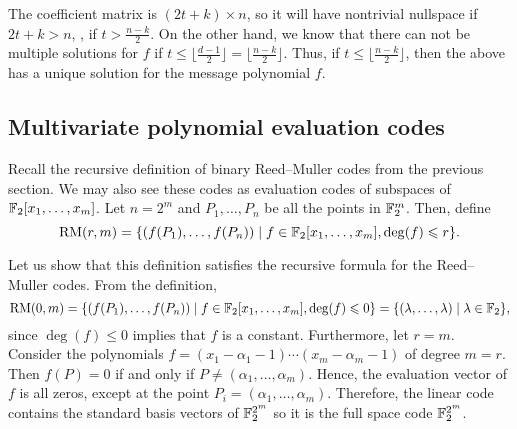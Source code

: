 \documentclass[../main.tex]{subfiles}
\begin{document}
The coefficient matrix is $(2t + k) \times n$, so it will have nontrivial nullspace if $2t + k > n$, \ie, if $t > \frac{n - k}{2}$. On the other hand, we know that there can not be multiple solutions for $f$ if $t \leq \lfloor \frac{d - 1}{2} \rfloor = \lfloor \frac{n - k}{2} \rfloor$. Thus, if $t \leq \lfloor \frac{n - k}{2} \rfloor$, then the above has a unique solution for the message polynomial $f$.

\subsection{Multivariate polynomial evaluation codes}

Recall the recursive definition of binary Reed--Muller codes from the previous section. We may also see these codes as evaluation codes of subspaces of $\mathbb{F}_2[x_1, \dots, x_m]$. Let $n = 2^m$ and $P_1, \dots, P_n$ be all the points in $\mathbb{F}_2^m$. Then, define
\begin{equation*}
    \operatorname{RM}(r, m) = \{ (f(P_1), \dots, f(P_n)) \mid f \in \mathbb{F}_2[x_1, \dots, x_m], \deg(f) \leqslant r \}.
\end{equation*}

Let us show that this definition satisfies the recursive formula for the Reed--Muller codes. From the definition,
\begin{equation*}
    \operatorname{RM}(0, m) = \{ (f(P_1), \dots, f(P_n)) \mid f \in \mathbb{F}_2[x_1, \dots, x_m], \deg(f) \leqslant 0 \} = \{ (\lambda, \dots, \lambda) \mid \lambda \in \mathbb{F}_2 \},
\end{equation*}
since $\deg(f) \leq 0$ implies that $f$ is a constant. Furthermore, let $r = m$. Consider the polynomials $f = (x_1 - \alpha_1 - 1) \cdots (x_m - \alpha_m - 1)$ of degree $m = r$. Then $f(P) = 0$ if and only if $P \neq (\alpha_1, \dots, \alpha_m)$. Hence, the evaluation vector of $f$ is all zeros, except at the point $P_i = (\alpha_1, \dots, \alpha_m)$. Therefore, the linear code contains the standard basis vectors of $\mathbb{F}_2^{2^m}$ so it is the full space code $\mathbb{F}_2^{2^m}$.
\end{document}
